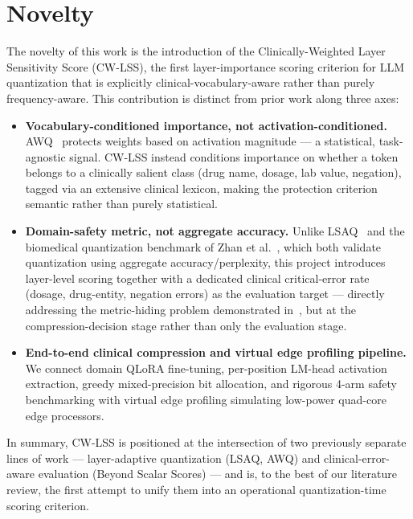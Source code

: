 \documentclass[conference]{IEEEtran}
\begin{document}
\section{Novelty}
The novelty of this work is the introduction of the Clinically-Weighted Layer Sensitivity Score (CW-LSS), the first layer-importance scoring criterion for LLM quantization that is explicitly clinical-vocabulary-aware rather than purely frequency-aware. This contribution is distinct from prior work along three axes:
\begin{itemize}
    \item \textbf{Vocabulary-conditioned importance, not activation-conditioned.} AWQ~\cite{lin2024awq} protects weights based on activation magnitude --- a statistical, task-agnostic signal. CW-LSS instead conditions importance on whether a token belongs to a clinically salient class (drug name, dosage, lab value, negation), tagged via an extensive clinical lexicon, making the protection criterion semantic rather than purely statistical.
    \item \textbf{Domain-safety metric, not aggregate accuracy.} Unlike LSAQ~\cite{zeng2024lsaq} and the biomedical quantization benchmark of Zhan et al.~\cite{zhan2025quantized}, which both validate quantization using aggregate accuracy/perplexity, this project introduces layer-level scoring together with a dedicated clinical critical-error rate (dosage, drug-entity, negation errors) as the evaluation target --- directly addressing the metric-hiding problem demonstrated in~\cite{lu2026beyond}, but at the compression-decision stage rather than only the evaluation stage.
    \item \textbf{End-to-end clinical compression and virtual edge profiling pipeline.} We connect domain QLoRA fine-tuning, per-position LM-head activation extraction, greedy mixed-precision bit allocation, and rigorous 4-arm safety benchmarking with virtual edge profiling simulating low-power quad-core edge processors.
\end{itemize}

In summary, CW-LSS is positioned at the intersection of two previously separate lines of work --- layer-adaptive quantization (LSAQ, AWQ) and clinical-error-aware evaluation (Beyond Scalar Scores) --- and is, to the best of our literature review, the first attempt to unify them into an operational quantization-time scoring criterion.
\end{document}
